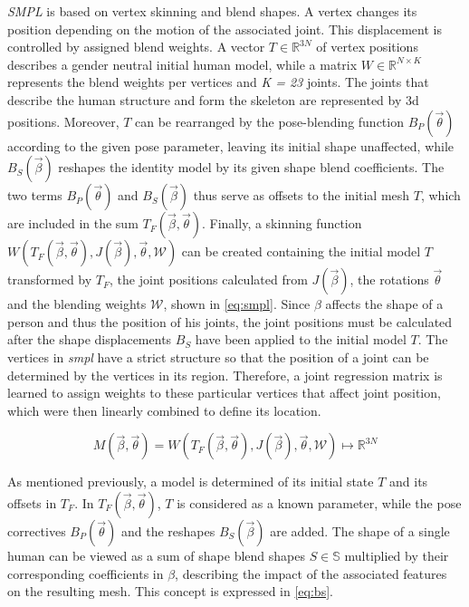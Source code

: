 \emph{SMPL} is based on vertex skinning and blend shapes. A vertex changes its position depending on the motion of the associated joint. This displacement is controlled by assigned blend weights. A vector $T \in \mathbb{R}^{3N}$ of vertex positions describes a gender neutral initial human model, while a matrix $W \in \mathbb{R}^{N \times K}$ represents the blend weights per vertices and \emph{K = 23} joints. The joints that describe the human structure and form the skeleton are represented by 3d positions. Moreover, $T$ can be rearranged by the pose-blending function $B_{P}(\vec{\theta})$ according to the given pose parameter, leaving its initial shape unaffected, while $B_{S}(\vec{\beta})$ reshapes the identity model by its given shape blend coefficients. The two terms $B_{P}(\vec{\theta})$ and $B_{S}(\vec{\beta})$ thus serve as offsets to the initial mesh $T$, which are included in the sum $T_{F}(\vec{\beta},\vec{\theta})$. Finally, a skinning function $W(T_{F}(\vec{\beta},\vec{\theta}),J(\vec{\beta}),\vec{\theta},\mathcal{W})$ can be created containing the initial model $T$ transformed by $T_{F}$, the joint positions calculated from $J(\vec{\beta})$, the rotations $\vec{\theta}$ and the blending weights $\mathcal{W}$, shown in \autoref{eq:smpl}. Since $\beta$ affects the shape of a person and thus the position of his joints, the joint positions must be calculated after the shape displacements $B_{S}$ have been applied to the initial model $T$. The vertices in \emph{smpl} have a strict structure so that the position of a joint can be determined by the vertices in its region. Therefore, a joint regression matrix is learned to assign weights to these particular vertices that affect joint position, which were then linearly combined to define its location.

\begin{equation}
\label{eq:smpl}
M(\vec{\beta},\vec{\theta}) = W(T_{F}(\vec{\beta},\vec{\theta}),J(\vec{\beta}),\vec{\theta},\mathcal{W}) \mapsto \mathbb{R}^{3N}
\end{equation}

As mentioned previously, a model is determined of its initial state $T$ and its offsets in $T_{F}$. In $T_{F}(\vec{\beta},\vec{\theta})$, $T$ is considered as a known parameter, while the pose correctives $B_{P}(\vec{\theta})$ and the reshapes $B_{S}(\vec{\beta})$ are added. The shape of a single human can be viewed as a sum of shape blend shapes $S \in \mathbb{S}$ multiplied by their corresponding coefficients in $\beta$, describing the impact of the associated features on the resulting mesh. This concept is expressed in \autoref{eq:bs}.

